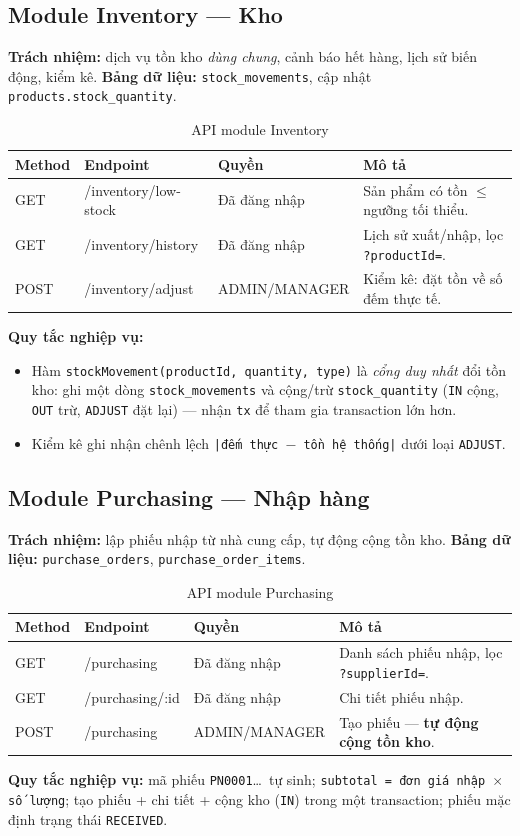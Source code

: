 \documentclass[12pt,a4paper]{report}
\begin{document}
\subsection{Module Inventory --- Kho}
\textbf{Trách nhiệm:} dịch vụ tồn kho \emph{dùng chung}, cảnh báo hết hàng, lịch sử biến động, kiểm kê. \textbf{Bảng dữ liệu:} \texttt{stock\_movements}, cập nhật \texttt{products.stock\_quantity}.
\begin{table}[H]\centering\small
\begin{tabularx}{\textwidth}{|L{1.5cm}|L{3.6cm}|L{3.4cm}|X|}
\hline
\textbf{Method} & \textbf{Endpoint} & \textbf{Quyền} & \textbf{Mô tả} \\ \hline
GET & /inventory/low-stock & Đã đăng nhập & Sản phẩm có tồn $\le$ ngưỡng tối thiểu. \\ \hline
GET & /inventory/history & Đã đăng nhập & Lịch sử xuất/nhập, lọc \texttt{?productId=}. \\ \hline
POST & /inventory/adjust & ADMIN/MANAGER & Kiểm kê: đặt tồn về số đếm thực tế. \\ \hline
\end{tabularx}
\caption{API module Inventory}
\end{table}
\textbf{Quy tắc nghiệp vụ:}
\begin{itemize}[leftmargin=1.4cm,nosep]
  \item Hàm \texttt{stockMovement(productId, quantity, type)} là \emph{cổng duy nhất} đổi tồn kho: ghi một dòng \texttt{stock\_movements} và cộng/trừ \texttt{stock\_quantity} (\texttt{IN} cộng, \texttt{OUT} trừ, \texttt{ADJUST} đặt lại) --- nhận \texttt{tx} để tham gia transaction lớn hơn.
  \item Kiểm kê ghi nhận chênh lệch \texttt{|đếm thực $-$ tồn hệ thống|} dưới loại \texttt{ADJUST}.
\end{itemize}

\subsection{Module Purchasing --- Nhập hàng}
\textbf{Trách nhiệm:} lập phiếu nhập từ nhà cung cấp, tự động cộng tồn kho. \textbf{Bảng dữ liệu:} \texttt{purchase\_orders}, \texttt{purchase\_order\_items}.
\begin{table}[H]\centering\small
\begin{tabularx}{\textwidth}{|L{1.5cm}|L{3.6cm}|L{3.4cm}|X|}
\hline
\textbf{Method} & \textbf{Endpoint} & \textbf{Quyền} & \textbf{Mô tả} \\ \hline
GET & /purchasing & Đã đăng nhập & Danh sách phiếu nhập, lọc \texttt{?supplierId=}. \\ \hline
GET & /purchasing/:id & Đã đăng nhập & Chi tiết phiếu nhập. \\ \hline
POST & /purchasing & ADMIN/MANAGER & Tạo phiếu --- \textbf{tự động cộng tồn kho}. \\ \hline
\end{tabularx}
\caption{API module Purchasing}
\end{table}
\textbf{Quy tắc nghiệp vụ:} mã phiếu \texttt{PN0001}\ldots\ tự sinh; \texttt{subtotal = đơn giá nhập $\times$ số lượng}; tạo phiếu + chi tiết + cộng kho (\texttt{IN}) trong một transaction; phiếu mặc định trạng thái \texttt{RECEIVED}.
\end{document}
